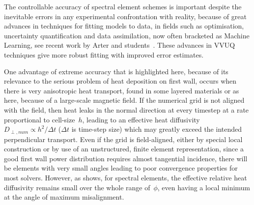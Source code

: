 The controllable accuracy of spectral element schemes is important despite the inevitable
errors in any experimental confrontation with reality, because of  great advances in techniques 
for fitting models to data, in fields such as optimisation, uncertainty 
quantification and data assimilation, now often bracketed as Machine 
Learning, see recent work by Arter and students~\cite{Ca18Sens,Ar18Data}. 
These advances in VVUQ techniques give more robust fitting with improved error estimates.

One advantage of extreme accuracy that is highlighted here, because of its relevance to the serious
problem of heat deposition on first wall, occurs when there is very anisotropic heat transport,
found in some layered materials or as here, because of a large-scale magnetic field.
If the numerical grid is not aligned with the field, then heat leaks in the normal direction at
every timestep at a rate proportional to cell-size~$h$, leading to an effective heat diffusivity
$D_{\perp,num}\propto h^2/\Delta t$ ($\Delta t$ is time-step size)
which may greatly exceed the intended perpendicular transport.
Even if the grid is field-aligned, either by special local construction or by use of an unstructured, finite element
representation, since a good first wall power distribution requires almost tangential 
incidence,  there will be elements with very small angles leading to poor convergence
properties for most solvers.
However, as  shows, for spectral elements,
the effective relative heat diffusivity
remains small over the whole range of~$\phi$, even having a
local minimum at the angle of maximum misalignment.
